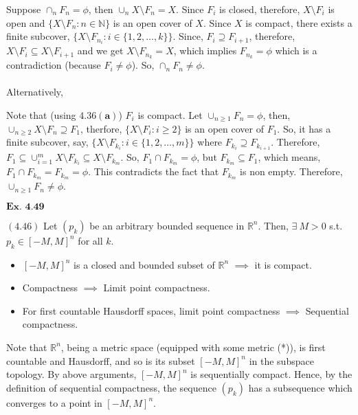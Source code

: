 \documentclass{article}
\begin{document}
Suppose $\cap_{n}F_n = \phi$, then $\cup_{n}X\setminus F_n = X$. Since $F_i$ is closed, therefore, $X\setminus F_i$ is open and $\{X\setminus F_n: n\in \mathbb{N}\}$ is an open cover of $X$. Since $X$ is compact, there exists a finite subcover, $\{X\setminus F_{n_i}: i \in \{1,2,\ldots,k\}\}$. Since, $F_i \supseteq F_{i+1}$, therefore, $X\setminus F_i \subseteq X\setminus F_{i+1}$ and we get $X\setminus F_{n_k} = X$, which implies $F_{n_{k}} = \phi$ which is a contradiction (because $F_{i} \neq \phi$). So, $\cap_{n}F_n \neq \phi$.\\~\\

Alternatively, \

Note that (using $\mathbf{4.36(a)}$) $F_i$ is compact. Let $\cup_{n\geq 1} F_n = \phi$, then, $\cup_{n\geq 2} X\setminus F_n \supseteq F_1$, therfore, $\{X\setminus F_i: i \geq 2\}$ is an open cover of $F_1$. So, it has a finite subcover, say, $\{X\setminus F_{k_i}: i \in \{1,2,\ldots,m\}\}$ where $F_{k_i} \supseteq F_{k_{i+1}}$. Therefore, $F_1 \subseteq \cup_{i=1}^{m}X\setminus F_{k_{i}} \subseteq X\setminus F_{k_{m}}$. So, $F_1 \cap F_{k_{m}} = \phi$, but $F_{k_{m}} \subseteq F_1$, which means, $F_{1}\cap F_{k_{m}} = F_{k_{m}} = \phi$. This contradicts the fact that $F_{k_{m}}$ is non empty. Therefore, $\cup_{n\geq 1} F_n \neq \phi$.

\vspace{0.2in}

${\textbf{Ex. 4.49}}$

$(\mathbf{4.46})$ Let $(p_k)$ be an arbitrary bounded sequence in $\mathbb{R}^n$. Then, $\exists\ M > 0$ s.t. $p_k \in [-M,M]^n$ for all $k$.
\begin{itemize}
    \item $[-M,M]^n$ is a closed and bounded subset of $\mathbb{R}^n$ $\implies $ it is compact.
    \item Compactness $\implies $ Limit point compactness.
    \item For first countable Hausdorff spaces, limit point compactness $\implies$ Sequential compactness.
\end{itemize}

Note that $\mathbb{R}^n$, being a metric space (equipped with some metric (*)), is first countable and Hausdorff, and so is its subset $[-M,M]^n$ in the subspace topology. By above arguments, $[-M,M]^n$ is sequentially compact. Hence, by the definition of sequential compactness, the sequence $(p_k)$ has a subsequence which converges to a point in $[-M,M]^n$.\\~\\
\end{document}
